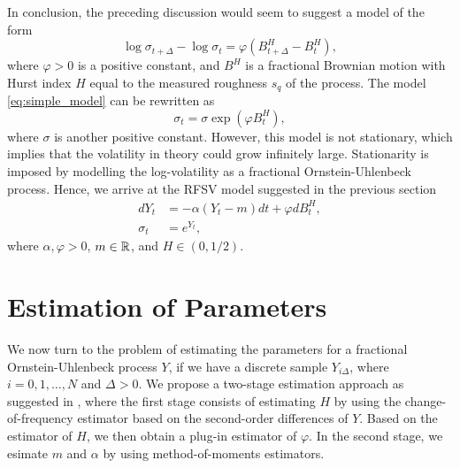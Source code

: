 In conclusion, the preceding discussion would seem to suggest a model of the form
\begin{equation}\label{eq:simple_model}
    \log \sigma_{t+\Delta} - \log \sigma_{t} = \varphi(B^{H}_{t+\Delta}-B^{H}_{t}),
\end{equation}
where $\varphi >0$ is a positive constant, and $B^{H}$ is a fractional Brownian motion with Hurst index $H$ equal to the measured roughness $s_{q}$ of the process. The model \eqref{eq:simple_model} can be rewritten as 
\begin{equation}
    \sigma_{t}=\sigma \exp\left(\varphi B_{t}^{H}\right),
\end{equation}
where $\sigma$ is another positive constant. However, this model is not stationary, which implies that the volatility in theory could grow infinitely large. Stationarity is imposed by modelling the log-volatility as a fractional Ornstein-Uhlenbeck process. Hence, we arrive at the RFSV model suggested in the previous section
\begin{align}
    dY_{t}&= -\alpha(Y_{t}-m)dt + \varphi dB^{H}_{t},\\
    \sigma_{t} &= e^{Y_{t}},
\end{align}
where $\alpha,\varphi>0$, $m\in \mathbb{R}$, and $H\in (0,1/2)$.
\section{Estimation of Parameters}
We now turn to the problem of estimating the parameters for a fractional Ornstein-Uhlenbeck process $Y$, if we have a discrete sample $Y_{i\Delta}$, where $i=0,1,\dots,N$ and $\Delta>0$. We propose a two-stage estimation approach as suggested in \cite{estimationfOU}, where the first stage consists of estimating $H$ by using the change-of-frequency estimator based on the second-order differences of $Y$. Based on the estimator of $H$, we then obtain a plug-in estimator of $\varphi$. In the second stage, we esimate $m$ and $\alpha$ by using method-of-moments estimators. 

